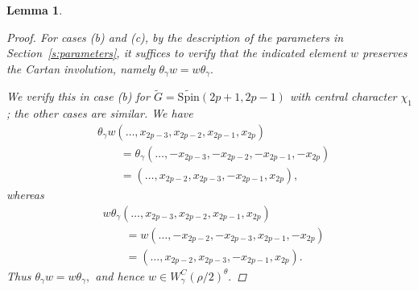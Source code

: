 \documentclass{amsart}
\newcommand{\Spin}{{\mathrm{Spin}}}
\newtheorem{lemma}[thm]{Lemma}
\theoremstyle{definition}
\begin{document}
\begin{lemma}
\begin{proof}
For cases (b) and (c), by the description of the parameters in
Section~\ref{s:parameters}, it suffices to verify that the indicated
element \(w\) preserves the Cartan involution, namely
$\theta_\gamma w=w\theta_\gamma.$

We verify this in case (b) for
\(\widetilde G=\widetilde{\Spin}(2p+1,2p-1)\)
with central character \(\chi_1\); the other cases are similar.
We have
\begin{align*}
&\theta_\gamma w
(\ldots,x_{2p-3},x_{2p-2},x_{2p-1},x_{2p})
\\
&\qquad
=
\theta_\gamma
(\ldots,-x_{2p-3},-x_{2p-2},-x_{2p-1},-x_{2p})
\\
&\qquad
=
(\ldots,x_{2p-2},x_{2p-3},-x_{2p-1},x_{2p}),
\end{align*}
whereas
\begin{align*}
&w\theta_\gamma
(\ldots,x_{2p-3},x_{2p-2},x_{2p-1},x_{2p})
\\
&\qquad
=
w(\ldots,-x_{2p-2},-x_{2p-3},x_{2p-1},-x_{2p})
\\
&\qquad
=
(\ldots,x_{2p-2},x_{2p-3},-x_{2p-1},x_{2p}).
\end{align*}
Thus
$\theta_\gamma w=w\theta_\gamma,$
and hence
$w\in W_\gamma^C(\rho/2)^\theta.$
\end{proof}
\end{lemma}
\end{document}
